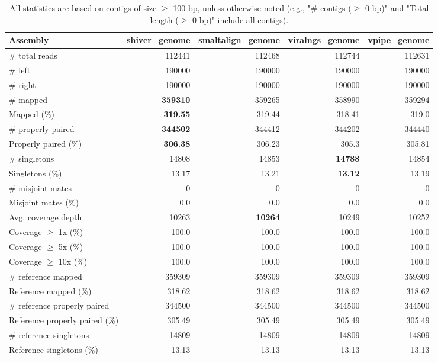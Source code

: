 \documentclass[12pt,a4paper]{article}
\begin{document}
\begin{table}[ht]
\begin{center}
\caption{All statistics are based on contigs of size $\geq$ 100 bp, unless otherwise noted (e.g., "\# contigs ($\geq$ 0 bp)" and "Total length ($\geq$ 0 bp)" include all contigs).}
\begin{tabular}{|l*{4}{|r}|}
\hline
Assembly & shiver\_genome & smaltalign\_genome & viralngs\_genome & vpipe\_genome \\ \hline
\# total reads & 112441 & 112468 & 112744 & 112631 \\ \hline
\# left & 190000 & 190000 & 190000 & 190000 \\ \hline
\# right & 190000 & 190000 & 190000 & 190000 \\ \hline
\# mapped & {\bf 359310} & 359265 & 358990 & 359294 \\ \hline
Mapped (\%) & {\bf 319.55} & 319.44 & 318.41 & 319.0 \\ \hline
\# properly paired & {\bf 344502} & 344412 & 344202 & 344440 \\ \hline
Properly paired (\%) & {\bf 306.38} & 306.23 & 305.3 & 305.81 \\ \hline
\# singletons & 14808 & 14853 & {\bf 14788} & 14854 \\ \hline
Singletons (\%) & 13.17 & 13.21 & {\bf 13.12} & 13.19 \\ \hline
\# misjoint mates & 0 & 0 & 0 & 0 \\ \hline
Misjoint mates (\%) & 0.0 & 0.0 & 0.0 & 0.0 \\ \hline
Avg. coverage depth & 10263 & {\bf 10264} & 10249 & 10252 \\ \hline
Coverage $\geq$ 1x (\%) & 100.0 & 100.0 & 100.0 & 100.0 \\ \hline
Coverage $\geq$ 5x (\%) & 100.0 & 100.0 & 100.0 & 100.0 \\ \hline
Coverage $\geq$ 10x (\%) & 100.0 & 100.0 & 100.0 & 100.0 \\ \hline
\# reference mapped & 359309 & 359309 & 359309 & 359309 \\ \hline
Reference mapped (\%) & 318.62 & 318.62 & 318.62 & 318.62 \\ \hline
\# reference properly paired & 344500 & 344500 & 344500 & 344500 \\ \hline
Reference properly paired (\%) & 305.49 & 305.49 & 305.49 & 305.49 \\ \hline
\# reference singletons & 14809 & 14809 & 14809 & 14809 \\ \hline
Reference singletons (\%) & 13.13 & 13.13 & 13.13 & 13.13 \\ \hline

\end{tabular}
\end{center}
\end{table}
\end{document}
